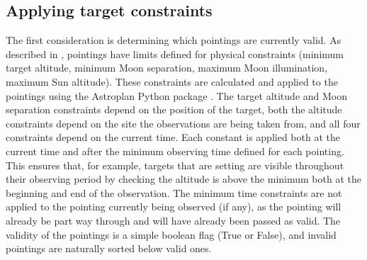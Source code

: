 \subsection{Applying target constraints}
\label{sec:constraints}
\begin{colsection}

The first consideration is determining which pointings are currently valid. As described in , pointings have limits defined for physical constraints (minimum target altitude, minimum Moon separation, maximum Moon illumination, maximum Sun altitude). These constraints are calculated and applied to the pointings using the Astroplan Python package \citep[\footnote{\url{https://astroplan.readthedocs.io}},][]{astroplan}. The target altitude and Moon separation constraints depend on the position of the target, both the altitude constraints depend on the site the observations are being taken from, and all four constraints depend on the current time. Each constant is applied both at the current time and after the minimum observing time defined for each pointing. This ensures that, for example, targets that are setting are visible throughout their observing period by checking the altitude is above the minimum both at the beginning and end of the observation. The minimum time constraints are not applied to the pointing currently being observed (if any), as the pointing will already be part way through and will have already been passed as valid. The validity of the pointings is a simple boolean flag (True or False), and invalid pointings are naturally sorted below valid ones.

\end{colsection}


